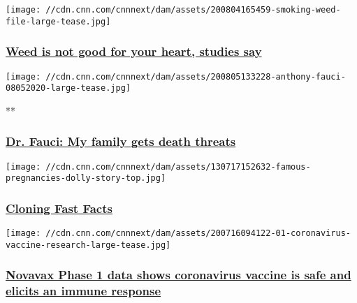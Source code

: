 \texttt{[image: //cdn.cnn.com/cnnnext/dam/assets/200804165459-smoking-weed-file-large-tease.jpg]}

\hypertarget{weed-is-not-good-for-your-heart-studies-say}{%
\subsubsection{\texorpdfstring{\href{/2020/08/05/health/weed-marijuana-heart-wellness/index.html}{Weed
is not good for your heart, studies
say}}{Weed is not good for your heart, studies say}}\label{weed-is-not-good-for-your-heart-studies-say}}

\href{/videos/health/2020/08/05/dr-anthony-fauci-security-threats-gupta-vpx.cnn}{}

\texttt{[image: //cdn.cnn.com/cnnnext/dam/assets/200805133228-anthony-fauci-08052020-large-tease.jpg]}

**

\hypertarget{dr-fauci-my-family-gets-death-threats}{%
\subsubsection{\texorpdfstring{\href{/videos/health/2020/08/05/dr-anthony-fauci-security-threats-gupta-vpx.cnn}{Dr.
Fauci: My family gets death
threats}}{Dr. Fauci: My family gets death threats}}\label{dr-fauci-my-family-gets-death-threats}}

\href{/2013/10/30/health/cloning-fast-facts/index.html}{}

\texttt{[image: //cdn.cnn.com/cnnnext/dam/assets/130717152632-famous-pregnancies-dolly-story-top.jpg]}

\hypertarget{cloning-fast-facts}{%
\subsubsection{\texorpdfstring{\href{/2013/10/30/health/cloning-fast-facts/index.html}{Cloning
Fast Facts}}{Cloning Fast Facts}}\label{cloning-fast-facts}}

\href{/2020/08/04/health/novavax-phase-1-vaccine/index.html}{}

\texttt{[image: //cdn.cnn.com/cnnnext/dam/assets/200716094122-01-coronavirus-vaccine-research-large-tease.jpg]}

\hypertarget{novavax-phase-1-data-shows-coronavirus-vaccine-is-safe-and-elicits-an-immune-response}{%
\subsubsection{\texorpdfstring{\href{/2020/08/04/health/novavax-phase-1-vaccine/index.html}{Novavax
Phase 1 data shows coronavirus vaccine is safe and elicits an immune
response}}{Novavax Phase 1 data shows coronavirus vaccine is safe and elicits an immune response}}\label{novavax-phase-1-data-shows-coronavirus-vaccine-is-safe-and-elicits-an-immune-response}}

